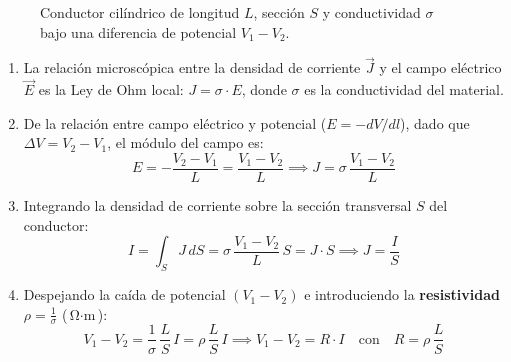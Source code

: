 \begin{figure}[H]
\centering
{}
\caption{Conductor cilíndrico de longitud $L$, sección $S$ y conductividad $\sigma$ bajo una diferencia de potencial $V_1 - V_2$.}
\end{figure}

\begin{enumerate}
    \item La relación microscópica entre la densidad de corriente $\vec{J}$ y el campo eléctrico $\vec{E}$ es la Ley de Ohm local: $J = \sigma \cdot E$, donde $\sigma$ es la conductividad del material.
    \item De la relación entre campo eléctrico y potencial ($E = -dV/dl$), dado que $\Delta V = V_2 - V_1$, el módulo del campo es:
    \begin{equation}
        E = -\frac{V_2 - V_1}{L} = \frac{V_1 - V_2}{L} \implies J = \sigma\,\frac{V_1 - V_2}{L}
    \end{equation}
    \item Integrando la densidad de corriente sobre la sección transversal $S$ del conductor:
    \begin{equation}
        I = \int_S J\,dS = \sigma\,\frac{V_1 - V_2}{L}\,S = J\cdot S \implies J = \frac{I}{S}
    \end{equation}
    \item Despejando la caída de potencial $(V_1 - V_2)$ e introduciendo la \textbf{resistividad} $\rho = \frac{1}{\sigma}$ ($\si{\ohm\cdot\meter}$):
    \begin{equation}
        V_1 - V_2 = \frac{1}{\sigma}\,\frac{L}{S}\,I = \rho\,\frac{L}{S}\,I \implies \boxed{V_1 - V_2 = R\cdot I} \quad \text{con} \quad \boxed{R = \rho\,\frac{L}{S}}
    \end{equation}
\end{enumerate}

